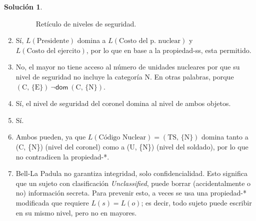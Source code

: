 \documentclass{article}
\theoremstyle{definition}
\newtheorem{soln}{Solución}
\begin{document}
\begin{soln}
\begin{enumerate}
\begin{figure}[htp]
  \caption{Retículo de niveles de seguridad.\label{fig:lattice} }
\end{figure}
  \item Sí, $L(\text{Presidente})$ domina a $L(\text{Costo del p.\ nuclear})$ y
    $L(\text{Costo del ejercito})$, por lo que en base a la propiedad-ss, esta
    permitido.
\item No, el mayor no tiene acceso al número de unidades nucleares por que su
  nivel de seguridad no incluye la categoría N. En otras palabras, porque 
  $(\text{C, \{E\}})~\neg\mathsf{dom}~(\text{C, \{N\}})$.
\item Sí, el nivel de seguridad del coronel domina al nivel de ambos objetos.
\item Sí.
\item Ambos pueden, ya que $L(\text{Código Nuclear}) = (\text{TS, \{N\}})$
  domina tanto a (C, \{N\}) (nivel del coronel) como a (U, \{N\}) (nivel del
  soldado), por lo que no contradicen la propiedad-*.
\item Bell-La Padula no garantiza integridad, solo confidencialidad. Esto
  significa que un sujeto con clasificación \textit{Unclassified}, puede borrar
  (accidentalmente o no) información secreta. Para prevenir esto, a veces se
  usa una propiedad-* modificada que requiere $L(s) = L(o)$; es decir, todo
  sujeto puede escribir en su mismo nivel, pero no en mayores.
\end{enumerate}
\end{soln}
\end{document}
